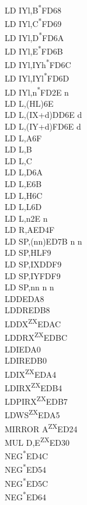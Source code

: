 \documentclass[twoside,openright,a4paper]{book}
\begin{document}
\begin{multicols}{3}
{\begin{tabbing}
	LD IYl,B\textsuperscript{*}\>FD68\\
	LD IYl,C\textsuperscript{*}\>FD69\\
	LD IYl,D\textsuperscript{*}\>FD6A\\
	LD IYl,E\textsuperscript{*}\>FD6B\\
	LD IYl,IYh\textsuperscript{*}\>FD6C\\
	LD IYl,IYl\textsuperscript{*}\>FD6D\\
	LD IYl,n\textsuperscript{*}\>FD2E n\\
	LD L,(HL)\>6E\\
	LD L,(IX+d)\>DD6E d\\
	LD L,(IY+d)\>FD6E d\\
	LD L,A\>6F\\
	LD L,B\\
	LD L,C\\
	LD L,D\>6A\\
	LD L,E\>6B\\
	LD L,H\>6C\\
	LD L,L\>6D\\
	LD L,n\>2E n\\
	LD R,A\>ED4F\\
	LD SP,(nn)\>ED7B n n\\
	LD SP,HL\>F9\\
	LD SP,IX\>DDF9\\
	LD SP,IY\>FDF9\\
	LD SP,nn n n\\
	LDD\>EDA8\\
	LDDR\>EDB8\\
	LDDX\textsuperscript{ZX}\>EDAC\\
	LDDRX\textsuperscript{ZX}\>EDBC\\
	LDI\>EDA0\\
	LDIR\>EDB0\\
	LDIX\textsuperscript{ZX}\>EDA4\\
	LDIRX\textsuperscript{ZX}\>EDB4\\
	LDPIRX\textsuperscript{ZX}\>EDB7\\
	LDWS\textsuperscript{ZX}\>EDA5\\
	MIRROR A\textsuperscript{ZX}\>ED24\\
	MUL D,E\textsuperscript{ZX}\>ED30\\
	NEG\textsuperscript{*}\>ED4C\\
	NEG\textsuperscript{*}\>ED54\\
	NEG\textsuperscript{*}\>ED5C\\
	NEG\textsuperscript{*}\>ED64\\

\end{tabbing}}
\end{multicols}
\end{document}
